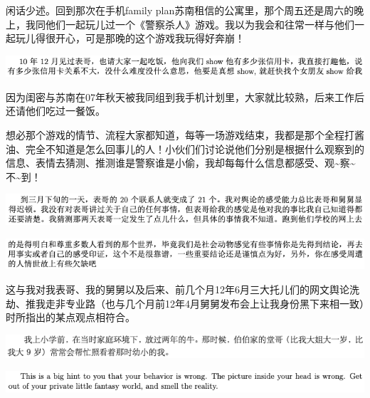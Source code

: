 \documentclass[9pt, b5paper]{article}
\begin{document}
闲话少述。回到那次在手机family plan苏南租信的公寓里，那个周五还是周六的晚上，我同他们一起玩儿过一个《警察杀人》游戏。我以为我会和往常一样与他们一起玩儿得很开心，可是那晚的这个游戏我玩得好奔崩！

\begin{center}
\includegraphics[width=.9\linewidth]{./pic/backups_plans_20210425_152933.png}
\end{center}

因为闺密与苏南在07年秋天被我同组到我手机计划里，大家就比较熟，后来工作后还请他们吃过一餐饭。

想必那个游戏的情节、流程大家都知道，每等一场游戏结束，我都是那个全程打酱油、完全不知道是怎么回事儿的人！小伙们们讨论说他们分别是根据什么观察到的信息、表情去猜测、推测谁是警察谁是小偷，我却每每什么信息都感受、观\textasciitilde{}察\textasciitilde{}不\textasciitilde{}到！

\begin{center}
\includegraphics[width=.9\linewidth]{./pic/backups_plans_20210425_153712.png}
\end{center}

\begin{center}
\includegraphics[width=.9\linewidth]{./pic/backups_plans_20210425_153639.png}
\end{center}

这与我对我表哥、我的舅舅以及后来、前几个月12年6月三大托儿们的网文舆论洗劫、推我走非专业路（也与几个月前12年4月舅舅发布会上让我身份黑下来相一致）时所指出的某点观点相符合。

\begin{center}
\includegraphics[width=.9\linewidth]{./pic/backups_plans_20210425_154237.png}
\end{center}

\begin{center}
\includegraphics[width=.9\linewidth]{./pic/readme_20210425_160306.png}
\end{center}
\end{document}
